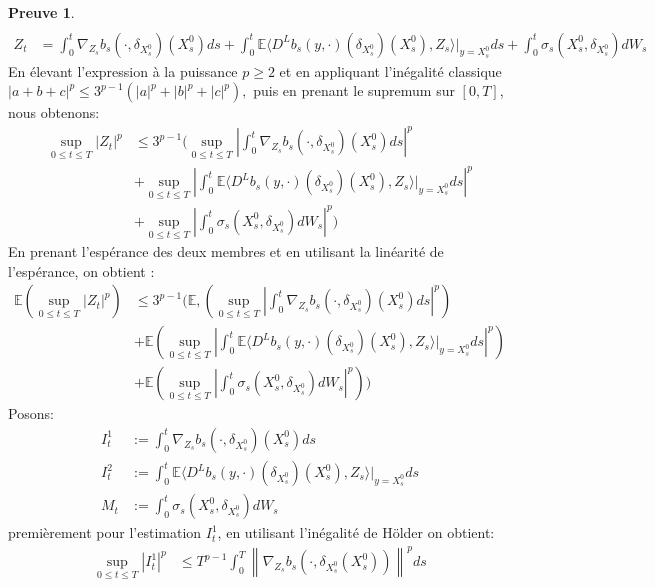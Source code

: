 \documentclass[12pt,a4paper,twoside,fleqn]{book}%
\theoremstyle{definition}
\newtheorem*{pr}{\textbf{Preuve}}
\theoremstyle{lemme}
\numberwithin{equation}{section}
\begin{document}
\begin{pr}
\[\begin{aligned}
\\
Z_t &= \int_{0}^{t}\nabla_{Z_s}b_s(\cdot,\delta_{X_s^0})(X_s^0)ds + \int_{0}^{t}\mathbb{E}\langle D^Lb_s(y,\cdot)(\delta_{X_s^0})(X_s^0),Z_s \rangle|_{y=X_s^0}ds +\int_{0}^{t}\sigma_s(X_s^0,\delta_{X_s^0})dW_s
\end{aligned}
\]En élevant l'expression à la puissance $p\geq 2$ et en appliquant l'inégalité classique $ |a+b+c|^p \leq 3^{p-1}(|a|^p + |b|^p +|c|^p),$ puis en prenant le supremum sur $[0,T]$, nous obtenons:
\[
\begin{aligned}
\sup_{0\leq t \leq T}|Z_t|^p&\leq 3^{p-1}\Big(\sup_{0\leq t \leq T}\left|\int_{0}^{t}\nabla_{Z_s}b_s(\cdot,\delta_{X_s^0})(X_s^0)ds\right|^p \\&+\sup_{0\leq t \leq T}\left|\int_{0}^{t}\mathbb{E}\langle D^Lb_s(y,\cdot)(\delta_{X_s^0})(X_s^0),Z_s\rangle|_{y=X_s^0}ds\right|^p\\
&+\sup_{0\leq t \leq T}\left|\int_{0}^{t}\sigma_s(X_s^0,\delta_{X_s^0})dW_s\right|^p\Big)
\end{aligned}
\]
En prenant l’espérance des deux membres et en utilisant la linéarité de l’espérance, on obtient :
\begin{equation}
\begin{aligned}\label{eq:2.2.28}
	\mathbb{E}\left(\sup_{0\leq t \leq T}|Z_t|^p\right)&\leq 3^{p-1}\Big(\mathbb{E},\left(\sup_{0\leq t \leq T}\left|\int_{0}^{t}\nabla_{Z_s}b_s(\cdot,\delta_{X_s^0})(X_s^0)ds\right|^p\right) \\&+\mathbb{E}\left(\sup_{0\leq t \leq T}\left|\int_{0}^{t}\mathbb{E}\langle D^Lb_s(y,\cdot)(\delta_{X_s^0})(X_s^0),Z_s\rangle|_{y=X_s^0}ds\right|^p\right)\\
	&+\mathbb{E}\left(\sup_{0\leq t \leq T}\left|\int_{0}^{t}\sigma_s(X_s^0,\delta_{X_s^0})dW_s\right|^p\right)\Big)
\end{aligned}
\end{equation}
Posons:
\[
\begin{aligned}
I_t^1 &:= \int_{0}^{t}\nabla_{Z_s}b_s(\cdot,\delta_{X_s^0})(X_s^0)ds\\
I_t^2 & :=\int_{0}^{t}\mathbb{E}\langle D^Lb_s(y,\cdot)(\delta_{X_s^0})(X_s^0),Z_s\rangle|_{y=X_s^0}ds\\
M_t&:= \int_{0}^{t}\sigma_s(X_s^0,\delta_{X_s^0})dW_s
\end{aligned}
\]
premièrement pour l'estimation $I_t^1$, en utilisant l'inégalité de Hölder on obtient:
\[
\begin{aligned}
	\sup_{0\leq t \leq T}|I_t^1|^p&\leq T^{p-1}\int_{0}^{T}\left\|\nabla_{Z_s}b_s(\cdot,\delta_{X_s^0}(X_s^0))\right\|^pds \\ 

\end{aligned}\]
\end{pr}
\end{document}
